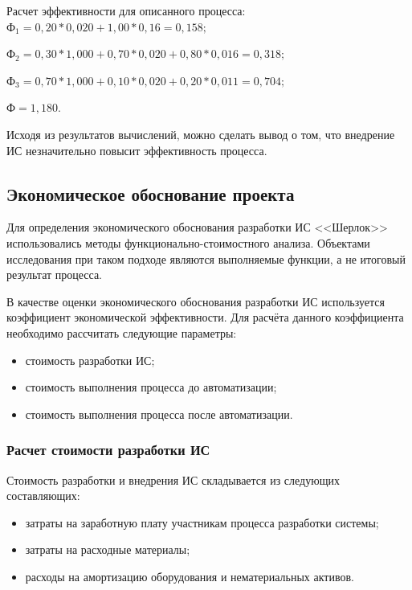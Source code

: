 			Расчет эффективности для описанного процесса:
			$Ф_1 = 0,20 * 0,020 + 1,00 * 0,16  = 0,158; $

			$Ф_2 = 0,30 * 1,000 + 0,70 * 0,020 + 0,80 * 0,016 = 0,318; $

			$Ф_3 = 0,70 * 1,000 + 0,10 * 0,020 + 0,20 * 0,011 = 0,704; $

			$Ф = 1,180. $			

			Исходя из результатов вычислений, можно сделать вывод о том, что внедрение ИС незначительно повысит эффективность процесса.

	\subsection{Экономическое обоснование проекта}

	Для определения экономического обоснования разработки ИС <<Шерлок>> использовались методы функционально-стоимостного анализа. Объектами исследования при таком подходе являются выполняемые функции, а не итоговый результат процесса.

	В качестве оценки экономического обоснования разработки ИС используется коэффициент экономической эффективности. Для расчёта данного коэффициента необходимо рассчитать следующие параметры:
	\begin{itemize}
		\item стоимость разработки ИС;
		\item стоимость выполнения процесса до автоматизации;
		\item стоимость выполнения процесса после автоматизации.
	\end{itemize}

		\subsubsection{Расчет стоимости разработки ИС}

			Стоимость разработки и внедрения ИС складывается из следующих составляющих: 
			\begin{itemize}
				\item затраты на заработную плату участникам процесса разработки системы;
				\item затраты на расходные материалы; 
				\item расходы на амортизацию оборудования и нематериальных активов.
			\end{itemize}

